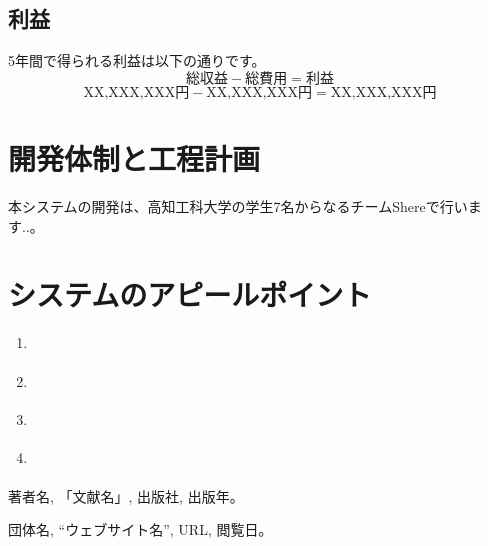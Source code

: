 \documentclass{docs}
\begin{document}
\subsection{利益}
5年間で得られる利益は以下の通りです。
$$
\text{総収益} - \text{総費用} = \text{利益}
$$
$$
\text{XX,XXX,XXX円} - \text{XX,XXX,XXX円} = \text{XX,XXX,XXX円}
$$

\section{開発体制と工程計画}

本システムの開発は、高知工科大学の学生7名からなるチームShereで行います..。



\section{システムのアピールポイント}
\begin{enumerate}
    \item \textbf{}
    \item \textbf{}
    \item \textbf{}
    \item \textbf{}
\end{enumerate}

\begin{thebibliography}{99}
    著者名, 「文献名」, 出版社, 出版年。

    団体名, “ウェブサイト名”, URL, 閲覧日。
\end{thebibliography}
\end{document}
